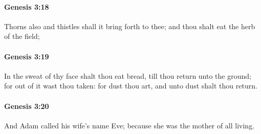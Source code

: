 		\paragraph{Genesis 3:18} %
			\label{GENESIS-3-18}

			Thorns also and thistles shall it bring forth to thee; and thou shalt eat the herb of the field;


		\paragraph{Genesis 3:19} %
			\label{GENESIS-3-19}

			In the sweat of thy face shalt thou eat bread, till thou return unto the ground; for out of it wast thou taken: for dust thou art, and unto dust shalt thou return.


		\paragraph{Genesis 3:20} %
			\label{GENESIS-3-20}

			And Adam called his wife's name Eve; because she was the mother of all living.


